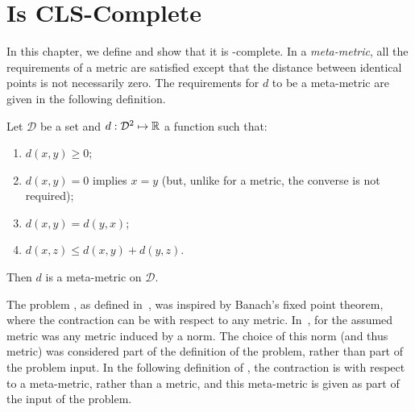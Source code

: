\chapter{\MMCM Is CLS-Complete}
\label{sec:MMCMisCLScomplete}

In this chapter, we define \MMCM and show that it is \CLS-complete.
In a \emph{meta-metric}, all the requirements of a metric are satisfied except
that the distance between identical points is not necessarily zero. The
requirements for $d$ to be a meta-metric are given in the following definition.

\begin{definition}
\label{def:metametric}
Let $\mathcal{D}$ be a set and $d:\mathcal{D}^2 \mapsto \mathbb{R}$ a function such that:
\begin{enumerate}
\item $d(x, y) \ge 0$;
\item $d(x, y) = 0$ implies $x = y$ (but, unlike for a metric, the converse is not required);
\item $d(x, y) = d(y, x)$;
\item $d(x, z) \le d(x, y) + d(y, z)$.
\end{enumerate}
Then $d$ is a meta-metric on $\mathcal{D}$.
\end{definition}

The problem \CM, as defined in~\cite{daskalakis2011continuous}, was inspired by
Banach's fixed point theorem, where the contraction can be with respect to any
metric.  In~\cite{daskalakis2011continuous}, for \CM the assumed metric was any
metric induced by a norm. The choice of this norm (and thus metric) was
considered part of the definition of the problem, rather than part of the
problem input. In the following definition of \MMCM, the contraction is with
respect to a meta-metric, rather than a metric, and this meta-metric is given as part of the input of
the problem.

